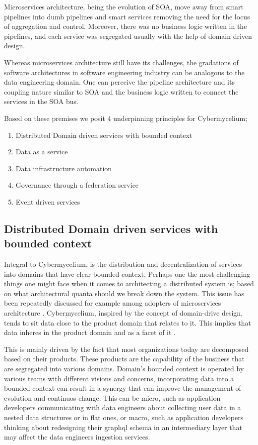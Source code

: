 \documentclass[review]{elsarticle}
\begin{document}
Microservices architecture, being the evolution of SOA, move away from smart pipelines into dumb pipelines and smart services removing the need for the locus of aggregation and control. Moreover, there was no business logic written in the pipelines, and each service was segregated usually with the help of domain driven design. 

Whereas microservices architecture still have its challenges, the gradations of software architectures in software engineering industry can be analogous to the data engineering domain. One can perceive the pipeline architecture and its coupling nature similar to SOA and the business logic written to connect the services in the SOA bus. 

Based on these premises we posit 4 underpinning principles for Cybermycelium; 

\begin{enumerate}
    \item Distributed Domain driven services with bounded context
    \item Data as a service
    \item Data infrastructure automation
    \item Governance through a federation service 
    \item Event driven services

\end{enumerate}

\subsection{Distributed Domain driven services with bounded context}

Integral to Cybermycelium, is the distribution and decentralization of services into domains that have clear bounded context. Perhaps one the most challenging things one might face when it comes to architecting a distributed system is; based on what architectural quanta should we break down the system. This issue has been repeatedly discussed for example among adopters of microservices architecture . Cybermycelium, inspired by the concept of domain-drive design, tends to sit data close to the product domain that relates to it. This implies that data inheres in the product domain and as a facet of it \cite{laigner2021data}.

This is mainly driven by the fact that most organizations today are decomposed based on their products. These products are the capability of the business that are segregated into various domains. Domain's bounded context is operated by various teams with different visions and concerns, incorporating data into a bounded context can result in a synergy that can improve the management of evolution and continuos change. This can be micro, such as application developers communicating with data engineers about collecting user data in a nested data structures or in flat ones, or macro, such as application developers thinking about redesigning their graphql schema in an intermediary layer that may affect the data engineers ingestion services. 
\end{document}
